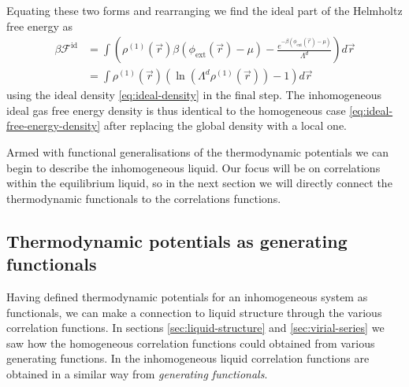 Equating these two forms and rearranging we find the ideal part of the Helmholtz free energy as
\begin{align}
  \beta \mathcal{F}^\mathrm{id}
  &=
  \int
  \left(
  \rho^{(1)}(\vec{r}) \beta (\phi_\mathrm{ext}(\vec{r}) - \mu)
  - \frac{e^{-\beta (\phi_\mathrm{ext}(\vec{r}) - \mu)}}{\Lambda^d}
  \right)
  d\vec{r}
  \nonumber \\ &=
  \int
  \rho^{(1)}(\vec{r})
  \left(
  \ln{(\Lambda^d \rho^{(1)}(\vec{r}))} - 1
  \right)
  d\vec{r}
  \label{eq:ideal-free-energy-functional}
\end{align}
using the ideal density \eqref{eq:ideal-density} in the final step.
The inhomogeneous ideal gas free energy density is thus identical to the homogeneous case \eqref{eq:ideal-free-energy-density} after replacing the global density with a local one.

Armed with functional generalisations of the thermodynamic potentials we can begin to describe the inhomogeneous liquid.
Our focus will be on correlations within the equilibrium liquid, so in the next section we will directly connect the thermodynamic functionals to the correlations functions.

\subsection{Thermodynamic potentials as generating functionals}

Having defined thermodynamic potentials for an inhomogeneous system as functionals, we can make a connection to liquid structure through the various correlation functions.
In sections \ref{sec:liquid-structure} and \ref{sec:virial-series} we saw how the homogeneous correlation functions could obtained from various generating functions.
In the inhomogeneous liquid correlation functions are obtained in a similar way from \emph{generating functionals}.

